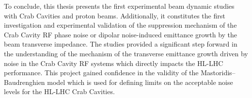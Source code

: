 


To conclude, this thesis presents the first experimental beam dynamic studies with Crab Cavities and proton beams. Additionally, it constitutes the first investigation and experimental validation of the suppression mechanism of the Crab Cavity RF phase noise or dipolar noise-induced emittance growth by the beam transverse impedance. The studies provided a significant step forward in the understanding of the mechanism of the transverse emittance growth driven by noise in the Crab Cavity RF systems which directly impacts the HL-LHC performance. This project gained confidence in the validity of the Mastoridis--Baudrenghien model which is used for defining limits on the acceptable noise levels for the HL-LHC Crab Cavities.


